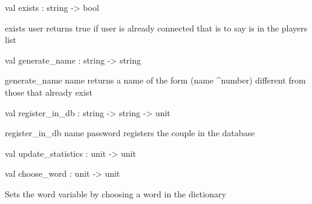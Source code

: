 \documentclass[11pt]{article}
\begin{document}
\label{val:Server.exists}\begin{ocamldoccode}
val exists : string -> bool
\end{ocamldoccode}
\begin{ocamldocdescription}
exists user returns true if user is already connected that is to say is in the players list


\end{ocamldocdescription}




\label{val:Server.generate-underscorename}\begin{ocamldoccode}
val generate_name : string -> string
\end{ocamldoccode}
\begin{ocamldocdescription}
generate\_name name returns a name of the form (name \textasciicircum  number) different from those that already exist


\end{ocamldocdescription}




\label{val:Server.register-underscorein-underscoredb}\begin{ocamldoccode}
val register_in_db : string -> string -> unit
\end{ocamldoccode}
\begin{ocamldocdescription}
register\_in\_db name password registers the couple in the database


\end{ocamldocdescription}




\label{val:Server.update-underscorestatistics}\begin{ocamldoccode}
val update_statistics : unit -> unit
\end{ocamldoccode}




\label{val:Server.choose-underscoreword}\begin{ocamldoccode}
val choose_word : unit -> unit
\end{ocamldoccode}
\begin{ocamldocdescription}
Sets the word variable by choosing a word in the dictionary


\end{ocamldocdescription}
\end{document}

